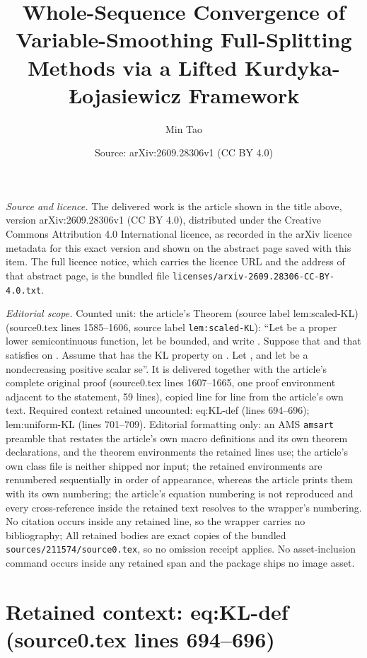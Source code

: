 \documentclass[10pt,a4paper]{amsart}
\title[Whole-Sequence Convergence of Variable-Smoothing Full-Splitting Methods via a Lifted Kurdyka-\L{}ojasiewicz Framework]{Whole-Sequence Convergence of Variable-Smoothing Full-Splitting Methods via a Lifted Kurdyka-\L{}ojasiewicz Framework}
\author{Min Tao}
\date{Source: arXiv:2609.28306v1 (CC BY 4.0)}
\theoremstyle{plain}
\theoremstyle{definition}
\theoremstyle{remark}
\begin{document}
\maketitle

\noindent\emph{Source and licence.} The delivered work is the article shown in the title above, version arXiv:2609.28306v1 (CC BY 4.0), distributed under the Creative Commons Attribution 4.0 International licence, as recorded in the arXiv licence metadata for this exact version and shown on the abstract page saved with this item. The full licence notice, which carries the licence URL and the address of that abstract page, is the bundled file \texttt{licenses/arxiv-2609.28306-CC-BY-4.0.txt}.
\par\smallskip

\noindent\textit{Editorial scope.} Counted unit: the article's Theorem (source label lem:scaled-KL) (source0.tex lines 1585--1606, source label \texttt{lem:scaled-KL}): ``Let be a proper lower semicontinuous function, let be bounded, and write . Suppose that and that satisfies on . Assume that has the KL property on . Let , and let be a nondecreasing positive scalar se''. It is delivered together with the article's complete original proof (source0.tex lines 1607--1665, one proof environment adjacent to the statement, 59 lines), copied line for line from the article's own text. Required context retained uncounted: eq:KL-def (lines 694--696); lem:uniform-KL (lines 701--709). Editorial formatting only: an AMS \texttt{amsart} preamble that restates the article's own macro definitions and its own theorem declarations, and the theorem environments the retained lines use; the article's own class file is neither shipped nor input; the retained environments are renumbered sequentially in order of appearance, whereas the article prints them with its own numbering; the article's equation numbering is not reproduced and every cross-reference inside the retained text resolves to the wrapper's numbering. No citation occurs inside any retained line, so the wrapper carries no bibliography; All retained bodies are exact copies of the bundled \texttt{sources/211574/source0.tex}, so no omission receipt applies. No asset-inclusion command occurs inside any retained span and the package ships no image asset.


\section*{Retained context: eq:KL-def (source0.tex lines 694--696)}
\end{document}
